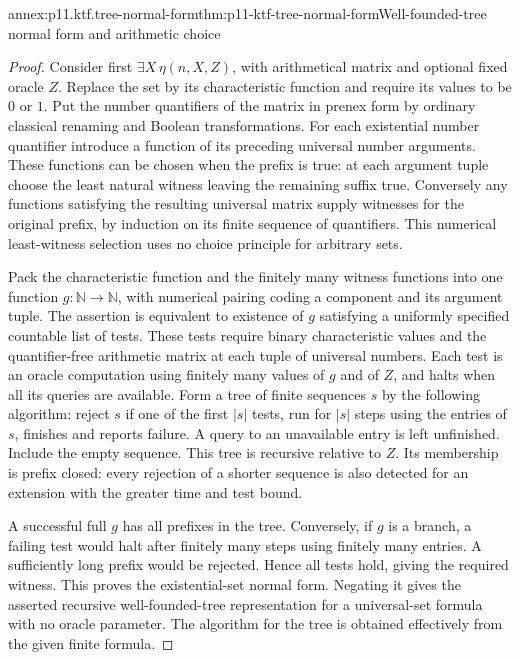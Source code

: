 \begin{annexitem}{annex:p11.ktf.tree-normal-form}{thm:p11-ktf-tree-normal-form}{Well-founded-tree normal form and arithmetic choice}
\begin{proof}
Consider first \(\exists X\,\eta(n,X,Z)\), with arithmetical
matrix and optional fixed oracle \(Z\). Replace the set by its
characteristic function and require its values to be \(0\) or \(1\).
Put the number quantifiers of the matrix in prenex form by ordinary
classical renaming and Boolean transformations. For each existential
number quantifier introduce a function of its preceding universal number
arguments. These functions can be chosen when the prefix is true:
at each argument tuple choose the least natural witness leaving the
remaining suffix true. Conversely any functions satisfying the resulting
universal matrix supply witnesses for the original prefix, by induction
on its finite sequence of quantifiers. This numerical least-witness
selection uses no choice principle for arbitrary sets.

Pack the characteristic function and the finitely many witness functions
into one function \(g:\mathbb N\to\mathbb N\), with numerical
pairing coding a component and its argument tuple. The assertion is
equivalent to existence of \(g\) satisfying a uniformly specified
countable list of tests. These tests require binary characteristic
values and the quantifier-free arithmetic matrix at each tuple of
universal numbers. Each test is an oracle computation using finitely
many values of \(g\) and of \(Z\), and halts when all its queries
are available. Form a tree of finite sequences \(s\) by the following
algorithm: reject \(s\) if one of the first \(|s|\) tests, run for
\(|s|\) steps using the entries of \(s\), finishes and reports
failure. A query to an unavailable entry is left unfinished. Include
the empty sequence. This tree is recursive relative to \(Z\).
Its membership is prefix closed: every rejection of a shorter sequence
is also detected for an extension with the greater time and test bound.

A successful full \(g\) has all prefixes in the tree. Conversely, if
\(g\) is a branch, a failing test would halt after finitely many
steps using finitely many entries. A sufficiently long prefix would
be rejected. Hence all tests hold, giving the required witness. This
proves the existential-set normal form. Negating it gives the asserted
recursive well-founded-tree representation for a universal-set formula
with no oracle parameter. The algorithm for the tree is obtained
effectively from the given finite formula.


\end{proof}
\end{annexitem}
